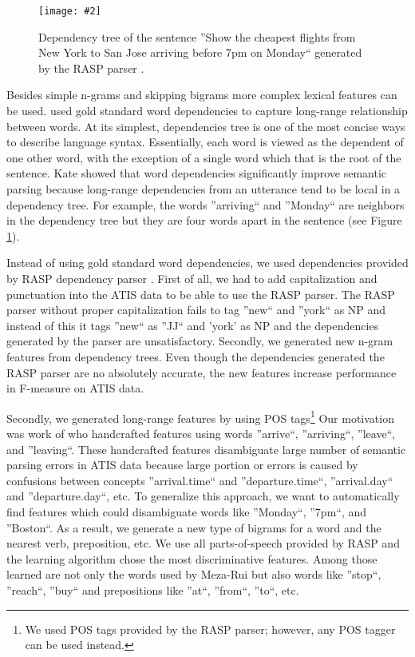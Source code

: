 \documentclass[11pt]{article}
\newcommand{\fgrparam}[4]{
  \begin{figure}[htbp]
    \begin{center}
      \leavevmode
      \texttt{[image: \#2]}
    \end{center}
    \caption{#4}
    \label{#3}
  \end{figure}
}
\begin{document}
\fgrparam{width=8cm}{./fig/dep-tree.pdf}{fig:dep:tree}{Dependency tree of the sentence ''Show the cheapest flights from New York to San Jose arriving before 7pm on Monday`` generated by the RASP parser \cite{rasp06}.}

Besides simple n-grams and skipping bigrams more complex lexical features can be used. \cite{kate08} used gold standard word dependencies to capture long-range relationship between words. At its simplest, dependencies tree is one of the most concise ways to describe language syntax. Essentially, each word is viewed as the dependent of one other word, with the exception of a single word which that is the root of the sentence. Kate showed that word dependencies significantly improve semantic parsing because long-range dependencies from an utterance tend to be local in a dependency tree. For example, the words ''arriving`` and ''Monday`` are neighbors in the dependency tree but they are four words apart in the sentence (see Figure \ref{fig:dep:tree}).

Instead of using gold standard word dependencies, we used dependencies provided by RASP dependency parser \cite{rasp06}. First of all, we had to add capitalization and punctuation into the ATIS data to be able to use the RASP parser. The RASP parser without proper capitalization fails to tag ''new`` and ''york`` as NP and instead of this it tags ''new`` as ''JJ`` and 'york' as NP and the dependencies generated by the parser are unsatisfactory. Secondly, we generated new n-gram features from dependency trees. Even though the dependencies generated the RASP parser are no absolutely accurate, the new features increase performance in F-measure on ATIS data. 

Secondly, we generated long-range features by using POS tags\footnote{We used POS tags provided by the RASP parser; however, any POS tagger can be used instead.} 
Our motivation was work of \cite{meza08a,meza08b} who handcrafted features using words ''arrive``, ''arriving``, ''leave``, and ''leaving``. These handcrafted features disambiguate large number of semantic parsing errors in ATIS data because large portion or errors is caused by confusions between concepts ''arrival.time`` and ''departure.time``, ''arrival.day`` and ''departure.day``, etc. To generalize this approach, we want to automatically find features which could disambiguate words like ''Monday``, ''7pm``, and ''Boston``. As a result, we generate a new type of bigrams for a word and the nearest verb, preposition, etc. We use all parts-of-speech provided by RASP and the learning algorithm chose the most discriminative features. Among those learned are not only the words used by Meza-Rui but also words like ''stop``, ''reach``, ''buy`` and prepositions like ''at``, ''from``, ''to``, etc.
\end{document}

